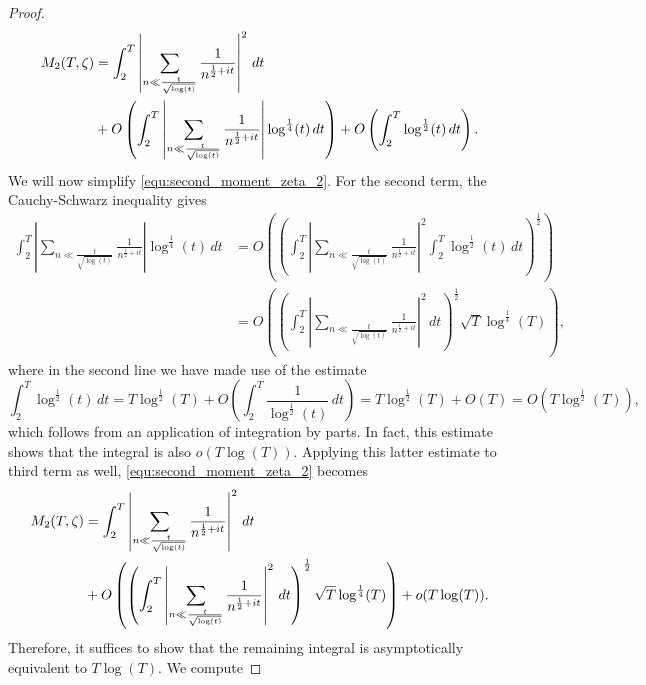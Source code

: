 \begin{proof}
      \begin{equation}\label{equ:second_moment_zeta_2}
        \begin{aligned}
          M_{2}(T,\zeta) &= \int_{2}^{T}\left|\sum_{n \ll \frac{t}{\sqrt{\log(t)}}}\frac{1}{n^{\frac{1}{2}+it}}\right|^{2}\,dt \\
          &+ O\left(\int_{2}^{T}\left|\sum_{n \ll \frac{t}{\sqrt{\log(t)}}}\frac{1}{n^{\frac{1}{2}+it}}\right|\log^{\frac{1}{4}}(t)\,dt\right)+O\left(\int_{2}^{T}\log^{\frac{1}{2}}(t)\,dt\right).
        \end{aligned}
      \end{equation}
      We will now simplify \cref{equ:second_moment_zeta_2}. For the second term, the Cauchy-Schwarz inequality gives
      \begin{align*}
        \int_{2}^{T}\left|\sum_{n \ll \frac{t}{\sqrt{\log(t)}}}\frac{1}{n^{\frac{1}{2}+it}}\right|\log^{\frac{1}{4}}(t)\,dt &= O\left(\left(\int_{2}^{T}\left|\sum_{n \ll \frac{t}{\sqrt{\log(t)}}}\frac{1}{n^{\frac{1}{2}+it}}\right|^{2}\int_{2}^{T}\log^{\frac{1}{2}}(t)\,dt\right)^{\frac{1}{2}}\right) \\
        &= O\left(\left(\int_{2}^{T}\left|\sum_{n \ll \frac{t}{\sqrt{\log(t)}}}\frac{1}{n^{\frac{1}{2}+it}}\right|^{2}\,dt\right)^{\frac{1}{2}}\sqrt{T}\log^{\frac{1}{4}}(T)\right),
      \end{align*}
      where in the second line we have made use of the estimate
      \[
        \int_{2}^{T}\log^{\frac{1}{2}}(t)\,dt = T\log^{\frac{1}{2}}(T)+O\left(\int_{2}^{T}\frac{1}{\log^{\frac{1}{2}}(t)}\,dt\right) = T\log^{\frac{1}{2}}(T)+O(T) = O(T\log^{\frac{1}{2}}(T)),
      \]
      which follows from an application of integration by parts. In fact, this estimate shows that the integral is also $o(T\log(T))$. Applying this latter estimate to third term as well, \cref{equ:second_moment_zeta_2} becomes
      \begin{equation}\label{equ:second_moment_zeta_3}
        \begin{aligned}
          M_{2}(T,\zeta) &= \int_{2}^{T}\left|\sum_{n \ll \frac{t}{\sqrt{\log(t)}}}\frac{1}{n^{\frac{1}{2}+it}}\right|^{2}\,dt \\
          &+ O\left(\left(\int_{2}^{T}\left|\sum_{n \ll \frac{t}{\sqrt{\log(t)}}}\frac{1}{n^{\frac{1}{2}+it}}\right|^{2}\,dt\right)^{\frac{1}{2}}\sqrt{T}\log^{\frac{1}{4}}(T)\right)+o(T\log(T)).
        \end{aligned}
      \end{equation}
      Therefore, it suffices to show that the remaining integral is asymptotically equivalent to $T\log(T)$. We compute

\end{proof}
